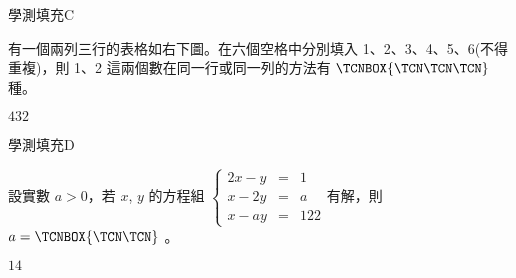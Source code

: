     \begin{QUESTION}
        \begin{ExamInfo}{99}{學測}{填充}{C}
        \end{ExamInfo}
        \begin{ExamAnsRateInfo}{26}{53}{22}{3}
        \end{ExamAnsRateInfo}
        \begin{QBODY}
            有一個兩列三行的表格如右下圖。在六個空格中分別填入 1、2、3、4、5、6(不得重複)，則 1、2 這兩個數在同一行或同一列的方法有 $\TCNBOX{\TCN\TCN\TCN}$ 種。

        \end{QBODY}
        \begin{QFROMS}
        \end{QFROMS}
        \begin{QTAGS}\end{QTAGS}
        \begin{QANS}
            $432$
        \end{QANS}
        \begin{QSOLLIST}
        \end{QSOLLIST}
        \begin{QEMPTYSPACE}
        \end{QEMPTYSPACE}
    \end{QUESTION}
    \begin{QUESTION}
        \begin{ExamInfo}{99}{學測}{填充}{D}
        \end{ExamInfo}
        \begin{ExamAnsRateInfo}{41}{71}{42}{10}
        \end{ExamAnsRateInfo}
        \begin{QBODY}
            設實數 $a>0$，若 $x$, $y$ 的方程組 $\left\{ \begin{array}{rcl} 2x-y & = &1 \\ x-2y &=&a \\ x-ay &= & 122 \end{array}\right.$有解，則$a=\TCNBOX{\TCN\TCN}$ 。
        \end{QBODY}
        \begin{QFROMS}
        \end{QFROMS}
        \begin{QTAGS}\end{QTAGS}
        \begin{QANS}
            $14$
        \end{QANS}
        \begin{QSOLLIST}
        \end{QSOLLIST}
        \begin{QEMPTYSPACE}
        \end{QEMPTYSPACE}
    \end{QUESTION}
